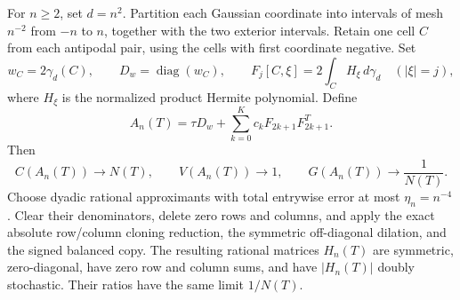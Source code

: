 \begin{proposition}
\label{prop:new-odd-tail-matrix-sequence}
For $n\geq2$, set $d=n^2$.  Partition each Gaussian coordinate into
intervals of mesh $n^{-2}$ from $-n$ to $n$, together with the two
exterior intervals.  Retain one cell $C$ from each antipodal pair,
using the cells with first coordinate negative.  Set
\[
 w_C=2\gamma_d(C),\qquad D_w=\operatorname{diag}(w_C),\qquad
 F_j[C,\xi]=2\int_C H_\xi\,d\gamma_d\quad(|\xi|=j),
\]
where $H_\xi$ is the normalized product Hermite polynomial.  Define
\begin{equation}\label{eq:new-odd-tail-seed}
 A_n(T)=\tau D_w+\sum_{k=0}^Kc_kF_{2k+1}F_{2k+1}^T.
\end{equation}
Then
\begin{equation}\label{eq:new-tail-matrix-limits}
 C(A_n(T))\to N(T),\qquad V(A_n(T))\to1,
 \qquad G(A_n(T))\to\frac1{N(T)}.
\end{equation}
Choose dyadic rational approximants with total entrywise error at most
$\eta_n=n^{-4}$.  Clear their denominators, delete zero rows and
columns, and apply the exact absolute row/column cloning reduction,
the symmetric off-diagonal dilation, and the signed balanced copy.
The resulting rational matrices $H_n(T)$ are symmetric, zero-diagonal,
have zero row and column sums, and have $|H_n(T)|$ doubly stochastic.
Their ratios have the same limit $1/N(T)$.
\end{proposition}
